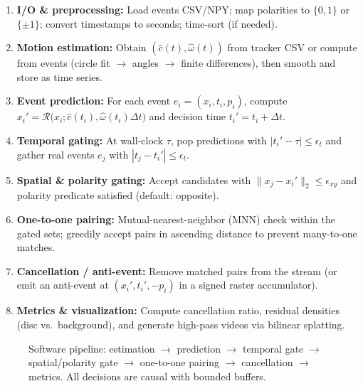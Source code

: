 \begin{enumerate}
  \item \textbf{I/O \& preprocessing:} Load events CSV/NPY; map polarities to $\{0,1\}$ or $\{\pm 1\}$; convert timestamps to seconds; time-sort (if needed).
  \item \textbf{Motion estimation:} Obtain $(\hat c(t),\hat\omega(t))$ from tracker CSV or compute from events (circle fit $\rightarrow$ angles $\rightarrow$ finite differences), then smooth and store as time series.
  \item \textbf{Event prediction:} For each event $e_i=(x_i,t_i,p_i)$, compute $x_i' = \mathcal{R}\!\big(x_i; \hat c(t_i), \hat\omega(t_i)\Delta t\big)$ and decision time $t_i' = t_i+\Delta t$.
  \item \textbf{Temporal gating:} At wall-clock $\tau$, pop predictions with $|t_i' - \tau| \le \epsilon_t$ and gather real events $e_j$ with $|t_j - t_i'| \le \epsilon_t$.
  \item \textbf{Spatial \& polarity gating:} Accept candidates with $\|x_j - x_i'\|_2 \le \epsilon_{xy}$ and polarity predicate satisfied (default: opposite).
  \item \textbf{One-to-one pairing:} Mutual-nearest-neighbor (MNN) check within the gated sets; greedily accept pairs in ascending distance to prevent many-to-one matches.
  \item \textbf{Cancellation / anti-event:} Remove matched pairs from the stream (or emit an anti-event at $(x_i',t_i',-p_i)$ in a signed raster accumulator).
  \item \textbf{Metrics \& visualization:} Compute cancellation ratio, residual densities (disc vs.\ background), and generate high-pass videos via bilinear splatting.
\end{enumerate}

\begin{figure}[t]
  \centering
  \caption{Software pipeline: estimation $\rightarrow$ prediction $\rightarrow$ temporal gate $\rightarrow$ spatial/polarity gate $\rightarrow$ one-to-one pairing $\rightarrow$ cancellation $\rightarrow$ metrics. All decisions are causal with bounded buffers.}
  \label{fig:pipeline}
\end{figure}


